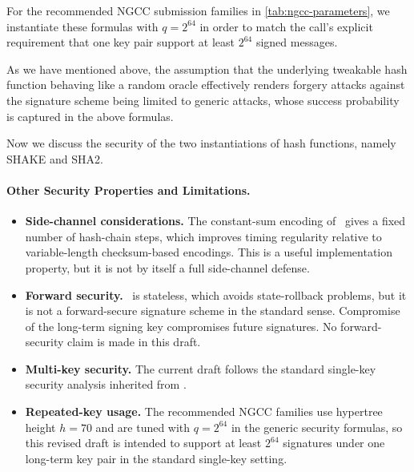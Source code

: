 For the recommended NGCC submission families in \cref{tab:ngcc-parameters}, we instantiate these formulas with $q=2^{64}$ in order to match the call's explicit requirement that one key pair support at least $2^{64}$ signed messages.

As we have mentioned above, the assumption that the underlying tweakable hash function behaving like a random oracle effectively renders forgery attacks against the signature scheme being limited to generic attacks, whose success probability is captured in the above formulas. 

Now we discuss the security of the two instantiations of hash functions, namely \textsf{SHAKE} and \textsf{SHA2}.

\paragraph{Other Security Properties and Limitations.}

\begin{itemize}
    \item \textbf{Side-channel considerations.} The constant-sum encoding of \WOTSCS\ gives a fixed number of hash-chain steps, which improves timing regularity relative to variable-length checksum-based encodings. This is a useful implementation property, but it is not by itself a full side-channel defense. 
    \item \textbf{Forward security.} \SPHINCSA\ is stateless, which avoids state-rollback problems, but it is not a forward-secure signature scheme in the standard sense. Compromise of the long-term signing key compromises future signatures. No forward-security claim is made in this draft.
    \item \textbf{Multi-key security.} The current draft follows the standard single-key security analysis inherited from \SPHINCSP. 
    \item \textbf{Repeated-key usage.} The recommended NGCC families use hypertree height $h=70$ and are tuned with $q=2^{64}$ in the generic security formulas, so this revised draft is intended to support at least $2^{64}$ signatures under one long-term key pair in the standard single-key setting. 
\end{itemize}

